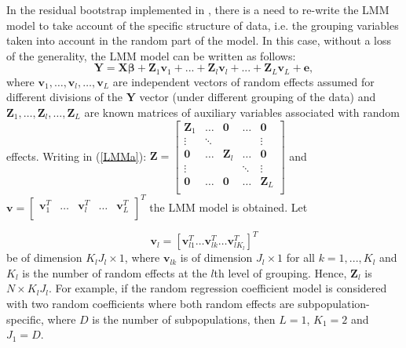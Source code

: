 In the residual bootstrap implemented in , there is a need to re-write the LMM model to take account of the specific structure of data, i.e. the grouping variables taken into account in the random part of the model. In this case, without a loss of the generality, the LMM model can be written as follows:
\begin{equation}\label{LMMa}
	\mathbf{Y}=\mathbf{X}\boldsymbol{\beta} + \mathbf{Z}_1\mathbf{v}_1+...+\mathbf{Z}_l\mathbf{v}_l+...+\mathbf{Z}_L\mathbf{v}_L+\mathbf{e},
\end{equation}
where $\mathbf{v}_1,\dots,\mathbf{v}_l,\dots,\mathbf{v}_L$ are independent vectors of random effects assumed for different divisions of the $\mathbf{Y}$ vector (under different grouping of the data) and $\mathbf{Z}_1, \dots, \mathbf{Z}_l, \dots, \mathbf{Z}_L$ are known matrices of auxiliary variables associated with random effects. Writing in (\ref{LMMa}): $\mathbf{Z}=
\begin{bmatrix}
	\mathbf{Z}_1 & \dots & \mathbf{0} & \dots  & \mathbf{0} \\
	\vdots & \ddots &  &  & \vdots \\
	\mathbf{0} & \dots & \mathbf{Z}_l & \dots & \mathbf{0} \\
	\vdots &  &  & \ddots & \vdots \\
	\mathbf{0} & \dots & \mathbf{0} & \dots & \mathbf{Z}_L \\
\end{bmatrix}$ and
$\mathbf{v}=
\begin{bmatrix}
	\mathbf{v}_1^T & \dots & \mathbf{v}_l^T & \dots  & \mathbf{v}_L^T \\
\end{bmatrix}^T$
the LMM model is obtained. Let


\begin{equation} \label{vl}
\mathbf{v}_l=\left[ \mathbf{v}_{l1}^T \dots \mathbf{v}_{lk}^T \dots \mathbf{v}_{lK_l}^T \right]^T	
\end{equation}
be of dimension $K_l J_l \times 1$, where $\mathbf{v}_{lk}$ is of dimension $J_l \times 1$ for all $k=1,...,K_l$ and $K_l$ is the number of random effects at the $l$th level of grouping. Hence,  $\mathbf{Z}_l$ is $N \times K_l J_l$. For example, if the random regression coefficient model is considered with two random coefficients where both random effects are subpopulation-specific, where $D$ is the number of subpopulations, then $L=1$, $K_1=2$ and $J_1=D$.

